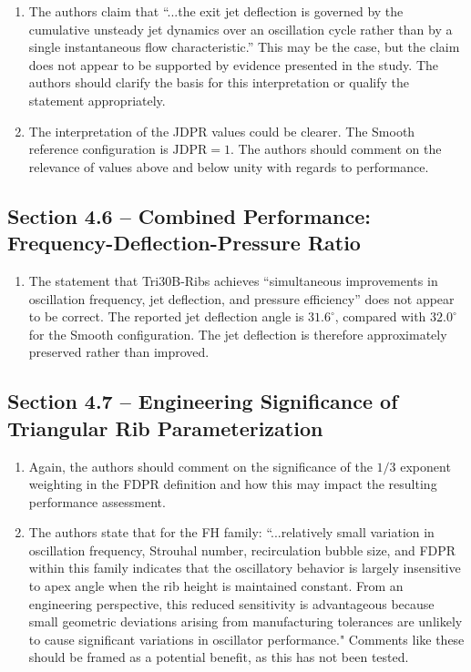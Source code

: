 \documentclass[11pt]{article}
\begin{document}
	\begin{enumerate}
		\item The authors claim that ``...the exit jet deflection is governed by the cumulative unsteady jet dynamics over an oscillation cycle rather than by a single instantaneous flow characteristic.'' This may be the case, but the claim does not appear to be supported by evidence presented in the study. The authors should clarify the basis for this interpretation or qualify the statement appropriately.
		
		\item The interpretation of the JDPR values could be clearer. The Smooth reference configuration is $\mathrm{JDPR}=1$. The authors should comment on the relevance of values above and below unity with regards to performance.
	\end{enumerate}
	
	\subsection*{Section 4.6 -- Combined Performance: Frequency-Deflection-Pressure Ratio}
	
	\begin{enumerate}
		\item The statement that Tri30B-Ribs achieves ``simultaneous improvements in oscillation frequency, jet deflection, and pressure efficiency'' does not appear to be correct. The reported jet deflection angle is $31.6^\circ$, compared with $32.0^\circ$ for the Smooth configuration. The jet deflection is therefore approximately preserved rather than improved. 
	\end{enumerate}
	
	\subsection*{Section 4.7 -- Engineering Significance of Triangular Rib Parameterization}
	
	\begin{enumerate}
		\item Again, the authors should comment on the significance of the $1/3$ exponent weighting in the FDPR definition and how this may impact the resulting performance assessment.
		
		\item The authors state that for the FH family: ``...relatively small variation in oscillation frequency, Strouhal number, recirculation bubble size, and FDPR within this family indicates that the oscillatory behavior is largely insensitive to apex angle when the rib height is maintained constant. From an engineering perspective, this reduced sensitivity is advantageous because small geometric deviations arising from manufacturing tolerances are unlikely to cause significant variations in oscillator performance." Comments like these should be framed as a potential benefit, as this has not been tested.
	\end{enumerate}
	
\end{document}
